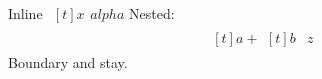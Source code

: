 \documentclass{article}
\begin{document}
Inline $ \begin{aligned}[t] x\end{aligned} alpha $
Nested:
\[\begin{aligned}[t] a + \begin{aligned}[t] b\end{aligned}\end{aligned} z\]
Boundary \baalpha and \eaalpha stay.
\end{document}
